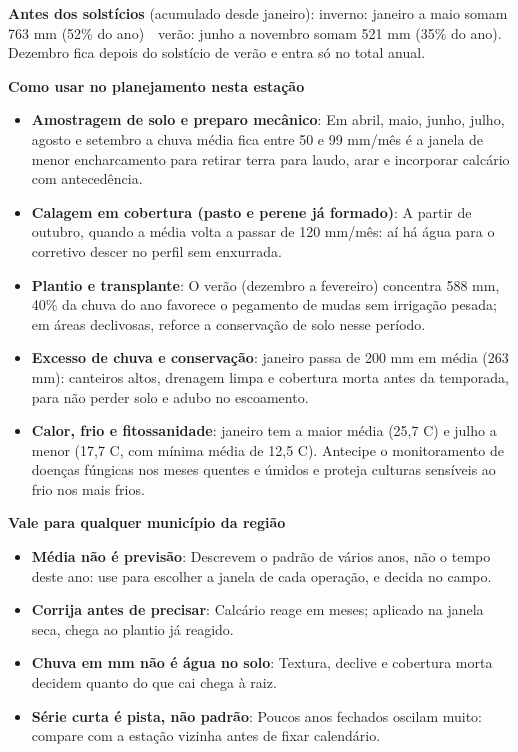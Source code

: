 \documentclass[10pt,a4paper]{article}
\begin{document}
\vspace{1pt}
{\footnotesize\textbf{Antes dos solstícios} (acumulado desde janeiro):
inverno: janeiro a maio somam 763 mm (52\% do ano) \,\textbullet\, verão: junho a novembro somam 521 mm (35\% do ano). Dezembro fica depois do solstício de verão e entra só no total
anual.}

\vspace{2pt}
{\bfseries\small Como usar no planejamento nesta estação}

\footnotesize\begin{itemize}\setlength{\itemsep}{0.5pt}
  \item \textbf{Amostragem de solo e preparo mecânico}: Em abril, maio, junho, julho, agosto e setembro a chuva média fica entre 50 e 99 mm/mês \textemdash{} é a janela de menor encharcamento para retirar terra para laudo, arar e incorporar calcário com antecedência.
  \item \textbf{Calagem em cobertura (pasto e perene já formado)}: A partir de outubro, quando a média volta a passar de 120 mm/mês: aí há água para o corretivo descer no perfil sem enxurrada.
  \item \textbf{Plantio e transplante}: O verão (dezembro a fevereiro) concentra 588 mm, 40\% da chuva do ano \textemdash{} favorece o pegamento de mudas sem irrigação pesada; em áreas declivosas, reforce a conservação de solo nesse período.
  \item \textbf{Excesso de chuva e conservação}: janeiro passa de 200 mm em média (263 mm): canteiros altos, drenagem limpa e cobertura morta antes da temporada, para não perder solo e adubo no escoamento.
  \item \textbf{Calor, frio e fitossanidade}: janeiro tem a maior média (25,7 \textdegree{}C) e julho a menor (17,7 \textdegree{}C, com mínima média de 12,5 \textdegree{}C). Antecipe o monitoramento de doenças fúngicas nos meses quentes e úmidos e proteja culturas sensíveis ao frio nos mais frios.
\end{itemize}

\vspace{1pt}
{\bfseries\small Vale para qualquer município da região}

\scriptsize\begin{itemize}\setlength{\itemsep}{0.5pt}
  \item \textbf{Média não é previsão}: Descrevem o padrão de vários anos, não o tempo deste ano: use para escolher a janela de cada operação, e decida no campo.
  \item \textbf{Corrija antes de precisar}: Calcário reage em meses; aplicado na janela seca, chega ao plantio já reagido.
  \item \textbf{Chuva em mm não é água no solo}: Textura, declive e cobertura morta decidem quanto do que cai chega à raiz.
  \item \textbf{Série curta é pista, não padrão}: Poucos anos fechados oscilam muito: compare com a estação vizinha antes de fixar calendário.
\end{itemize}
\end{document}
